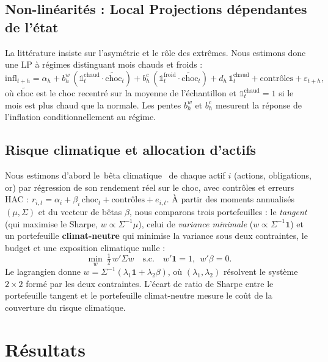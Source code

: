 \documentclass[11pt,a4paper]{article}
\providecommand{\og}{\guillemotleft\,}
\providecommand{\fg}{\,\guillemotright}
\begin{document}
\subsection{Non-linéarités : Local Projections dépendantes de l'état}
\label{sec:nl}
La littérature insiste sur l'asymétrie et le rôle des extrêmes. Nous estimons
donc une LP à régimes \citep[dans l'esprit de][]{jorda2005} distinguant mois chauds et froids :
\begin{equation}
\mathrm{infl}_{t+h} = \alpha_h + b^{w}_h\,(\mathbb{1}^{\text{chaud}}_t \cdot \widetilde{\mathrm{choc}}_t)
+ b^{c}_h\,(\mathbb{1}^{\text{froid}}_t \cdot \widetilde{\mathrm{choc}}_t)
+ d_h\,\mathbb{1}^{\text{chaud}}_t + \text{contrôles} + \varepsilon_{t+h},
\end{equation}
où $\widetilde{\mathrm{choc}}$ est le choc recentré sur la moyenne de l'échantillon et
$\mathbb{1}^{\text{chaud}}_t = 1$ si le mois est plus chaud que la normale. Les pentes
$b^w_h$ et $b^c_h$ mesurent la réponse de l'inflation conditionnellement au régime.

\subsection{Risque climatique et allocation d'actifs}
\label{sec:alloc}
Nous estimons d'abord le \og bêta climatique \fg{} de chaque actif $i$ (actions,
obligations, or) par régression de son rendement réel sur le choc, avec contrôles et erreurs HAC :
$r_{i,t} = \alpha_i + \beta_i\,\mathrm{choc}_t + \text{contrôles} + e_{i,t}$. À partir des
moments annualisés $(\mu,\Sigma)$ et du vecteur de bêtas $\beta$, nous comparons trois
portefeuilles : le \emph{tangent} (qui maximise le Sharpe, $w \propto \Sigma^{-1}\mu$), celui de
\emph{variance minimale} ($w \propto \Sigma^{-1}\mathbf{1}$) et un portefeuille
\textbf{climat-neutre} qui minimise la variance sous deux contraintes, le budget et une
exposition climatique nulle :
\begin{equation}
\min_{w}\ \tfrac12\,w'\Sigma w \quad \text{s.c.}\quad w'\mathbf{1}=1,\ \ w'\beta = 0.
\end{equation}
Le lagrangien donne $w = \Sigma^{-1}(\lambda_1\mathbf{1} + \lambda_2\beta)$, où
$(\lambda_1,\lambda_2)$ résolvent le système $2\times2$ formé par les deux contraintes.
L'écart de ratio de Sharpe entre le portefeuille tangent et le portefeuille climat-neutre mesure le coût de la
couverture du risque climatique.

\section{Résultats}
\end{document}
